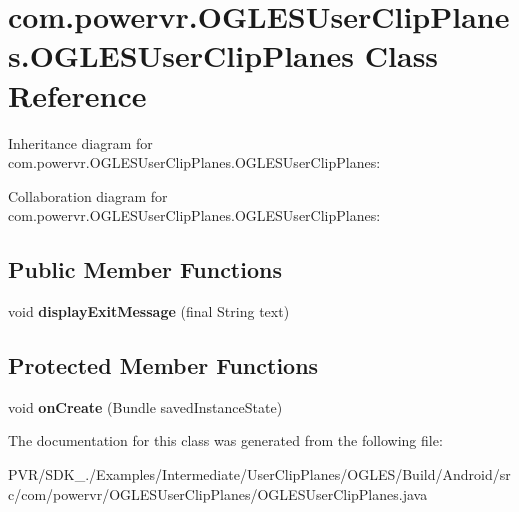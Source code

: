 \hypertarget{classcom_1_1powervr_1_1_o_g_l_e_s_user_clip_planes_1_1_o_g_l_e_s_user_clip_planes}{\section{com.\+powervr.\+O\+G\+L\+E\+S\+User\+Clip\+Planes.\+O\+G\+L\+E\+S\+User\+Clip\+Planes Class Reference}
\label{classcom_1_1powervr_1_1_o_g_l_e_s_user_clip_planes_1_1_o_g_l_e_s_user_clip_planes}
}


Inheritance diagram for com.\+powervr.\+O\+G\+L\+E\+S\+User\+Clip\+Planes.\+O\+G\+L\+E\+S\+User\+Clip\+Planes\+:


Collaboration diagram for com.\+powervr.\+O\+G\+L\+E\+S\+User\+Clip\+Planes.\+O\+G\+L\+E\+S\+User\+Clip\+Planes\+:
\subsection*{Public Member Functions}
\begin{DoxyCompactItemize}
\item 
\hypertarget{classcom_1_1powervr_1_1_o_g_l_e_s_user_clip_planes_1_1_o_g_l_e_s_user_clip_planes_a9a732b9b15e0da1dfa13edd54437240a}{void {\bfseries display\+Exit\+Message} (final String text)}\label{classcom_1_1powervr_1_1_o_g_l_e_s_user_clip_planes_1_1_o_g_l_e_s_user_clip_planes_a9a732b9b15e0da1dfa13edd54437240a}

\end{DoxyCompactItemize}
\subsection*{Protected Member Functions}
\begin{DoxyCompactItemize}
\item 
\hypertarget{classcom_1_1powervr_1_1_o_g_l_e_s_user_clip_planes_1_1_o_g_l_e_s_user_clip_planes_a219bb97d705fa9e60a17c1124076f407}{void {\bfseries on\+Create} (Bundle saved\+Instance\+State)}\label{classcom_1_1powervr_1_1_o_g_l_e_s_user_clip_planes_1_1_o_g_l_e_s_user_clip_planes_a219bb97d705fa9e60a17c1124076f407}

\end{DoxyCompactItemize}


The documentation for this class was generated from the following file\+:\begin{DoxyCompactItemize}
\item 
P\+V\+R/\+S\+D\+K\+\_./\+Examples/\+Intermediate/\+User\+Clip\+Planes/\+O\+G\+L\+E\+S/\+Build/\+Android/src/com/powervr/\+O\+G\+L\+E\+S\+User\+Clip\+Planes/O\+G\+L\+E\+S\+User\+Clip\+Planes.\+java\end{DoxyCompactItemize}
